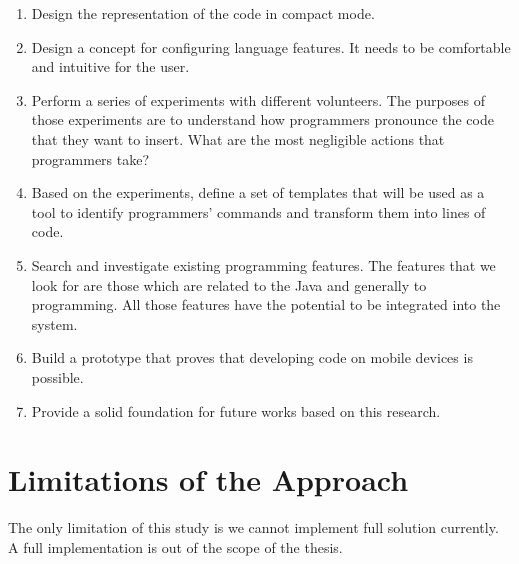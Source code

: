 \begin{enumerate}
	\item Design the representation of the code in compact mode.
	\item Design a concept for configuring language features. It needs to be comfortable and intuitive for the user.
	\item Perform a series of experiments with different volunteers. The purposes of those experiments are to understand how programmers pronounce the code that they want to insert. What are the most negligible actions that programmers take?
	\item Based on the experiments, define a set of templates that will be used as a tool to identify programmers’ commands and transform them into lines of code.
	\item Search and investigate existing programming features. The features that we look for are those which are related to the Java and generally to programming. All those features have the potential to be integrated into the system.
	\item Build a prototype that proves that developing code on mobile devices is possible.
	\item Provide a solid foundation for future works based on this research.
\end{enumerate}

\section{Limitations of the Approach}
The only limitation of this study is we cannot implement full solution currently. A full implementation is out of the scope of the thesis.

